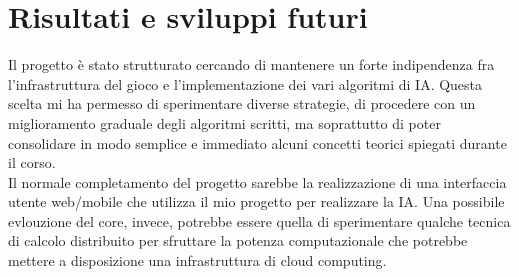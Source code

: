 \documentclass[paper=a4, fontsize=11pt]{scrartcl}	%
\numberwithin{equation}{section}															%
\numberwithin{figure}{section}																%
\numberwithin{table}{section}																%
\begin{document}
\section{Risultati e sviluppi futuri}
Il progetto \`e stato strutturato cercando di mantenere un forte indipendenza fra l'infrastruttura del gioco e l'implementazione dei vari algoritmi di IA. Questa scelta mi ha permesso di sperimentare diverse strategie, di procedere con un miglioramento graduale degli algoritmi scritti, ma soprattutto di poter consolidare in modo semplice e immediato alcuni concetti teorici spiegati durante il corso.\\
Il normale completamento del progetto sarebbe la realizzazione di una interfaccia utente web/mobile che utilizza il mio progetto per realizzare la IA. Una possibile evlouzione del core, invece, potrebbe essere quella di sperimentare qualche tecnica di calcolo distribuito per sfruttare la potenza computazionale che potrebbe mettere a disposizione una infrastruttura di cloud computing.
\end{document}
